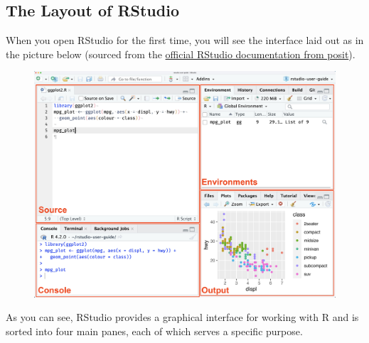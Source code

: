 \documentclass[
  letterpaper,
]{krantz}
\begin{document}
\hypertarget{the-layout-of-rstudio}{%
\subsection{The Layout of RStudio}\label{the-layout-of-rstudio}}

When you open RStudio for the first time, you will see the interface
laid out as in the picture below (sourced from the
\href{https://docs.posit.co/ide/user/ide/guide/ui/ui-panes.html}{official
RStudio documentation from posit}).

\begin{figure}

{\centering \includegraphics[width=4.58333in,height=\textheight]{images/rstudio-panes-with-labels.jpeg}

}

\end{figure}

As you can see, RStudio provides a graphical interface for working with
R and is sorted into four main panes, each of which serves a specific
purpose.
\end{document}
